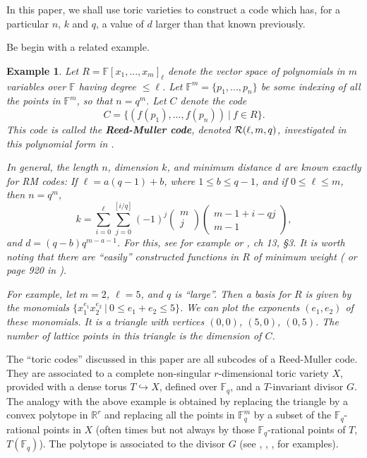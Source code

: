 \documentclass[12pt]{article}
\newtheorem{example}[theorem]{Example}
\def\fff{\mathbb{F}}
\def\rrr{\mathbb{R}}
\begin{document}
In this paper, we shall use toric varieties to construct a
code which has, for a particular $n$, $k$ and $q$, a
value of $d$ larger than that known previously.

Be begin with a related example.

\begin{example}
\label{example:RM}
Let $R=\fff [x_1,...,x_m]_{\ell}$ denote the
vector space of polynomials in $m$ variables over
$\fff$ having degree $\leq \ell$. Let
$\fff^m=\{p_1,...,p_n\}$ be some indexing of all
the points in $\fff^m$, so that $n=q^m$. Let $C$ denote the 
code
\[
C=\{(f(p_1),...,f(p_n))\ |\ f\in R\}.
\]
This code is called the {\bf Reed-Muller code},
denoted ${\cal R}(\ell,m,q)$, investigated in this
polynomial form in \cite{DGM}.

In general, the length $n$, dimension $k$, and minimum distance $d$
are known exactly for RM codes:
If $\ell=a(q-1)+b$, where $1\leq b\leq q-1$, and if
$0\leq \ell\leq m$, then
$n=q^m$, 
\[
k=
\sum_{i=0}^\ell\sum_{j=0}^{[i/q]}
(-1)^j
\left(
\begin{array}{c}
m\\ j
\end{array}
\right)
\left(
\begin{array}{c}
m-1+i-qj\\ 
m-1
\end{array}
\right),
\]
and $d=(q-b)q^{m-a-1}$.
For this, see for example \cite{DGM} or
\cite{MS}, ch 13, \S 3. It is worth noting that 
there are ``easily'' constructed functions in $R$ of minimum weight
(\cite{DGM} or page 920 in \cite{HCT}).

For example, let $m=2$, $\ell = 5$, and $q$ is ``large''. Then a basis for
$R$ is given by the monomials
$\{x_1^{e_1}x_2^{e_2}\ |\ 0\leq e_1+e_2\leq 5\}$.
We can plot the exponents $(e_1,e_2)$ of these monomials.
It is a triangle with vertices $(0,0)$, $(5,0)$,
$(0,5)$. The number of lattice points in this triangle 
is the dimension of $C$.
\end{example}

The ``toric codes'' discussed in this paper are all
subcodes of a Reed-Muller code.
They are associated to a complete non-singular $r$-dimensional 
toric variety $X$,
provided with a dense torus $T\hookrightarrow X$, defined
over $\fff_q$, and a $T$-invariant divisor $G$. 
The analogy with the above example is obtained by replacing the triangle
by a convex polytope in $\rrr^r$ and replacing 
all the points in $\fff_q^m$ by a subset of the 
$\fff_q$-rational points in $X$ (often times but not always by
those $\fff_q$-rational points of $T$, $T(\fff_q)$). 
The polytope is associated to the divisor $G$
(see \cite{E}, \cite{F}, \cite{JV}, for examples).
\end{document}
